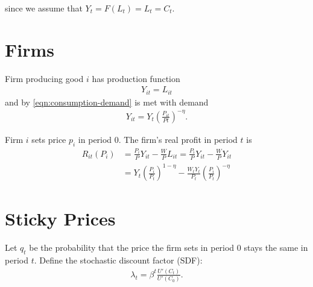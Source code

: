 \documentclass[../main.tex]{subfiles}
\begin{document}
        since we assume that $Y_t = F(L_t) = L_t = C_t$. %
        
    
    \section{Firms}
    
        Firm producing good $i$ has production function
        \begin{align}
            Y_{it} = L_{it}
        \end{align}
        and by \eqref{eqn:consumption-demand} is met with demand
        \begin{align}
            Y_{it} = Y_t \left(\frac{P_{it}}{Pt}\right)^{-\eta}.
            \label{eqn:markup-demand}
        \end{align}
        
        Firm $i$ sets price $p_i$ in period 0. The firm's real profit in period $t$ is
        \begin{align}
            R_{it}(P_i)
            &= \frac{P_i}{P}Y_{it} - \frac{W}{P} L_{it}
            = \frac{P_i}{P}Y_{it} - \frac{W}{P} Y_{it}
            \\
            &=
            Y_t \left(\frac{{P_i}}{P_t}\right)^{1-\eta} - \frac{W_tY_t}{P_t} \left(\frac{{P_i}}{P_t}\right)^{-\eta}
        \end{align}
        
    \section{Sticky Prices}
    
        Let $q_t$ be the probability that the price the firm sets in period $0$ stays the same in period $t$. Define the stochastic discount factor (SDF):
        \begin{align}
            \lambda_t = \beta^t \frac{U'(C_t)}{U'(C_0)}.
        \end{align}
        
\end{document}
